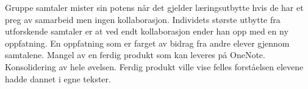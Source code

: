 \documentclass[main.tex]{subfiles}
\begin{document}
Gruppe samtaler mister sin potens når det gjelder 
læringsutbytte hvis de har et preg av samarbeid men ingen kollaborasjon. 
Individets største utbytte fra utforskende samtaler er at ved endt kollaborasjon ender 
han opp med en ny oppfatning. En oppfatning som er farget av bidrag fra andre elever 
gjennom samtalene. Mangel av en ferdig produkt som kan leveres på OneNote. Konsolidering av 
hele øvelsen. Ferdig produkt ville vise felles forståelsen elevene hadde dannet i egne
tekster.
\end{document}
